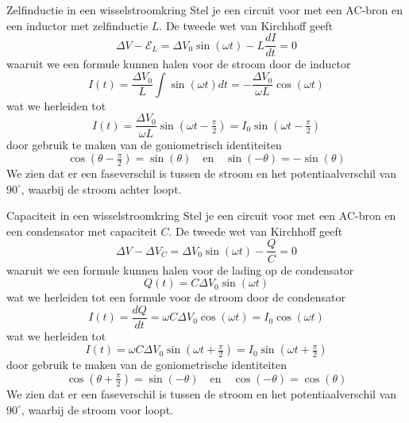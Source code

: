 \begin{pro}{Zelfinductie in een wisselstroomkring}
    Stel je een circuit voor met een AC-bron en een inductor met zelfinductie $L$. De tweede wet van Kirchhoff geeft
    \begin{equation*}
        \Delta V - \mathcal{E}_{L} = \Delta V_{0}\sin(\omega t) - L\dfrac{dI}{dt} = 0
    \end{equation*}
    waaruit we een formule kunnen halen voor de stroom door de inductor
    \begin{equation*}
        I(t) = \dfrac{\Delta V_{0}}{L}\int\sin(\omega t)dt = -\dfrac{\Delta V_{0}}{\omega L}\cos(\omega t)
    \end{equation*}
    wat we herleiden tot 
    \begin{equation*}
        I(t) = \dfrac{\Delta V_{0}}{\omega L}\sin(\omega t - \tfrac{\pi}{2}) = I_{0}\sin(\omega t - \tfrac{\pi}{2})
    \end{equation*}
    door gebruik te maken van de goniometrisch identiteiten 
    \begin{equation*}
        \cos(\theta - \tfrac{\pi}{2}) = \sin(\theta) \quad \text{en} \quad \sin(-\theta) = -\sin(\theta) 
    \end{equation*}
    We zien dat er een faseverschil is tussen de stroom en het potentiaalverschil van $90^{\circ}$, waarbij de stroom achter loopt.
\end{pro}

\begin{pro}{Capaciteit in een wisselstroomkring}
    Stel je een circuit voor met een AC-bron en een condensator met capaciteit $C$. De tweede wet van Kirchhoff geeft
    \begin{equation*}
        \Delta V - \Delta V_{C} = \Delta V_{0}\sin(\omega t) - \dfrac{Q}{C} = 0
    \end{equation*}
    waaruit we een formule kunnen halen voor de lading op de condensator
    \begin{equation*}
        Q(t) = C\Delta V_{0}\sin(\omega t)
    \end{equation*}
    wat we herleiden tot een formule voor de stroom door de condensator
    \begin{equation*}
        I(t) = \dfrac{dQ}{dt} = \omega C\Delta V_{0}\cos(\omega t) = I_{0}\cos(\omega t)
    \end{equation*}
    wat we herleiden tot
    \begin{equation*}
        I(t) = \omega C\Delta V_{0}\sin(\omega t + \tfrac{\pi}{2}) = I_{0}\sin(\omega t + \tfrac{\pi}{2})
    \end{equation*}
    door gebruik te maken van de goniometrische identiteiten
    \begin{equation*}
        \cos(\theta + \tfrac{\pi}{2}) = \sin(-\theta) \quad \text{en} \quad \cos(-\theta) = \cos(\theta)
    \end{equation*}
    We zien dat er een faseverschil is tussen de stroom en het potentiaalverschil van $90^{\circ}$, waarbij de stroom voor loopt.
\end{pro}

